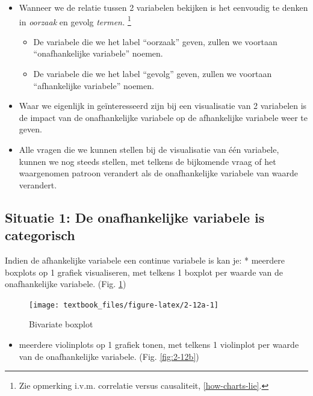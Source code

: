 \documentclass[]{tufte-book}
\providecommand{\tightlist}{%
  \setlength{\itemsep}{0pt}\setlength{\parskip}{0pt}}
\begin{document}
\begin{itemize}
\tightlist
\item
  Wanneer we de relatie tussen 2 variabelen bekijken is het eenvoudig te denken in \emph{oorzaak} en gevolg \emph{termen.} \footnote{Zie opmerking i.v.m. correlatie versus causaliteit, \ref{how-charts-lie}.}

  \begin{itemize}
  \tightlist
  \item
    De variabele die we het label ``oorzaak'' geven, zullen we voortaan ``onafhankelijke variabele'' noemen.
  \item
    De variabele die we het label ``gevolg'' geven, zullen we voortaan ``afhankelijke variabele'' noemen.
  \end{itemize}
\item
  Waar we eigenlijk in geïnteresseerd zijn bij een visualisatie van 2 variabelen is de impact van de onafhankelijke variabele op de afhankelijke variabele weer te geven.
\item
  Alle vragen die we kunnen stellen bij de visualisatie van één variabele, kunnen we nog steeds stellen, met telkens de bijkomende vraag of het waargenomen patroon verandert als de onafhankelijke variabele van waarde verandert.
\end{itemize}

\hypertarget{situatie-1-de-onafhankelijke-variabele-is-categorisch}{%
\subsection{Situatie 1: De onafhankelijke variabele is categorisch}\label{situatie-1-de-onafhankelijke-variabele-is-categorisch}}

Indien de afhankelijke variabele een continue variabele is kan je:
* meerdere boxplots op 1 grafiek visualiseren, met telkens 1 boxplot per waarde van de onafhankelijke variabele. (Fig. \ref{fig:2-12a})

\begin{figure}
\texttt{[image: textbook\_files/figure-latex/2-12a-1]} \caption[Bivariate boxplot]{Bivariate boxplot}\label{fig:2-12a}
\end{figure}

\begin{itemize}
\tightlist
\item
  meerdere violinplots op 1 grafiek tonen, met telkens 1 violinplot per waarde van de onafhankelijke variabele. (Fig. \ref{fig:2-12b})
\end{itemize}
\end{document}
